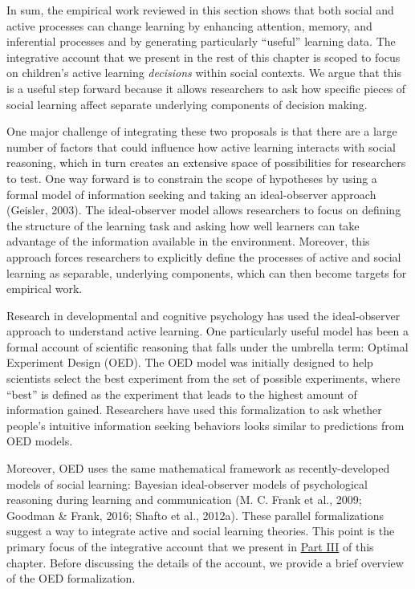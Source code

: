 \documentclass[oneside]{report}
\begin{document}
In sum, the empirical work reviewed in this section shows that both
social and active processes can change learning by enhancing attention,
memory, and inferential processes and by generating particularly
``useful'' learning data. The integrative account that we present in the
rest of this chapter is scoped to focus on children's active learning
\emph{decisions} within social contexts. We argue that this is a useful
step forward because it allows researchers to ask how specific pieces of
social learning affect separate underlying components of decision
making.

One major challenge of integrating these two proposals is that there are
a large number of factors that could influence how active learning
interacts with social reasoning, which in turn creates an extensive
space of possibilities for researchers to test. One way forward is to
constrain the scope of hypotheses by using a formal model of information
seeking and taking an ideal-observer approach (Geisler, 2003). The
ideal-observer model allows researchers to focus on defining the
structure of the learning task and asking how well learners can take
advantage of the information available in the environment. Moreover,
this approach forces researchers to explicitly define the processes of
active and social learning as separable, underlying components, which
can then become targets for empirical work.

Research in developmental and cognitive psychology has used the
ideal-observer approach to understand active learning. One particularly
useful model has been a formal account of scientific reasoning that
falls under the umbrella term: Optimal Experiment Design (OED). The OED
model was initially designed to help scientists select the best
experiment from the set of possible experiments, where ``best'' is
defined as the experiment that leads to the highest amount of
information gained. Researchers have used this formalization to ask
whether people's intuitive information seeking behaviors looks similar
to predictions from OED models.

Moreover, OED uses the same mathematical framework as recently-developed
models of social learning: Bayesian ideal-observer models of
psychological reasoning during learning and communication (M. C. Frank
et al., 2009; Goodman \& Frank, 2016; Shafto et al., 2012a). These
parallel formalizations suggest a way to integrate active and social
learning theories. This point is the primary focus of the integrative
account that we present in \protect\hyperlink{active_social}{Part III}
of this chapter. Before discussing the details of the account, we
provide a brief overview of the OED formalization.
\end{document}

